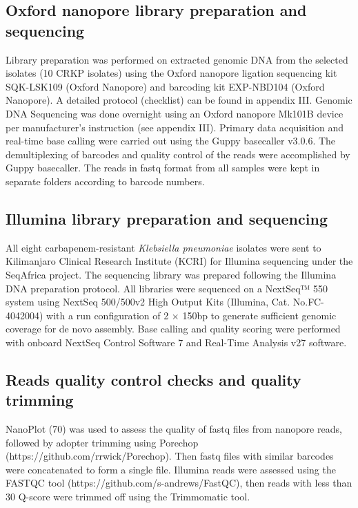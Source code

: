 \documentclass[preprint, 3p,
authoryear]{elsarticle} %
\begin{document}
\subsection{Oxford nanopore library preparation and
sequencing}\label{oxford-nanopore-library-preparation-and-sequencing}

Library preparation was performed on extracted genomic DNA from the
selected isolates (10 CRKP isolates) using the Oxford nanopore ligation
sequencing kit SQK-LSK109 (Oxford Nanopore) and barcoding kit EXP-NBD104
(Oxford Nanopore). A detailed protocol (checklist) can be found in
appendix III. Genomic DNA Sequencing was done overnight using an Oxford
nanopore Mk101B device per manufacturer's instruction (see appendix
III). Primary data acquisition and real-time base calling were carried
out using the Guppy basecaller v3.0.6. The demultiplexing of barcodes
and quality control of the reads were accomplished by Guppy basecaller.
The reads in fastq format from all samples were kept in separate folders
according to barcode numbers.

\subsection{Illumina library preparation and
sequencing}\label{illumina-library-preparation-and-sequencing}

All eight carbapenem-resistant \emph{Klebsiella pneumoniae} isolates
were sent to Kilimanjaro Clinical Research Institute (KCRI) for Illumina
sequencing under the SeqAfrica project. The sequencing library was
prepared following the Illumina DNA preparation protocol. All libraries
were sequenced on a NextSeq™ 550 system using NextSeq 500/500v2 High
Output Kits (Illumina, Cat. No.FC-4042004) with a run configuration of 2
× 150bp to generate sufficient genomic coverage for de novo assembly.
Base calling and quality scoring were performed with onboard NextSeq
Control Software 7 and Real-Time Analysis v27 software.

\subsection{Reads quality control checks and quality
trimming}\label{reads-quality-control-checks-and-quality-trimming}

NanoPlot (70) was used to assess the quality of fastq files from
nanopore reads, followed by adopter trimming using Porechop
(https://github.com/rrwick/Porechop). Then fastq files with similar
barcodes were concatenated to form a single file. Illumina reads were
assessed using the FASTQC tool (https://github.com/s-andrews/FastQC),
then reads with less than 30 Q-score were trimmed off using the
Trimmomatic tool.
\end{document}
